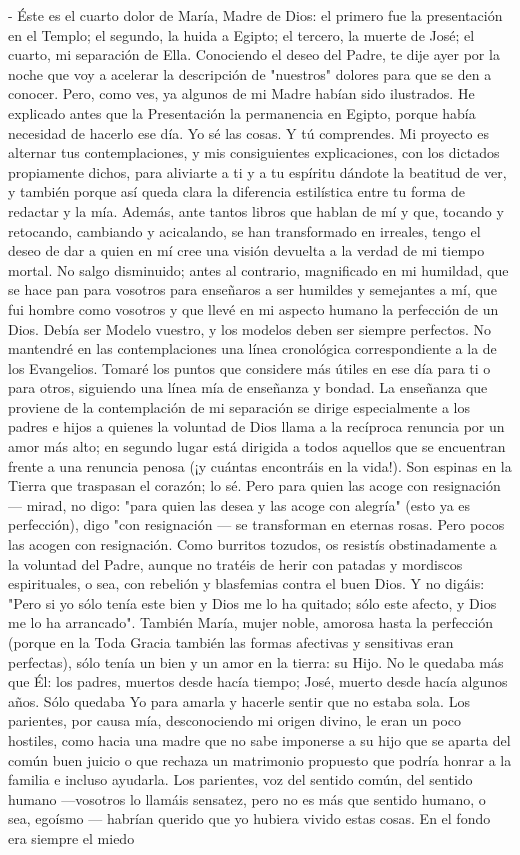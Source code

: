 \documentclass[12pt, twoside, openright]{book} %
\begin{document}
- Éste es el cuarto dolor de María, Madre de Dios: el primero fue la presentación en el Templo; el segundo, la huida a Egipto; el tercero, la muerte de José; el cuarto, mi separación de Ella. Conociendo el deseo del Padre, te dije ayer por la noche que voy a acelerar la descripción de "nuestros" dolores para que se den a conocer. Pero, como ves, ya algunos de mi Madre habían sido ilustrados. He explicado antes que la Presentación la permanencia en Egipto, porque había necesidad de hacerlo ese día. Yo sé las cosas. Y tú comprendes. Mi proyecto es alternar tus contemplaciones, y mis consiguientes explicaciones, con los dictados propiamente dichos, para aliviarte a ti y a tu espíritu dándote la beatitud de ver, y también porque así queda clara la diferencia estilística entre tu forma de redactar y la mía. Además, ante tantos libros que hablan de mí y que, tocando y retocando, cambiando y acicalando, se han transformado en irreales, tengo el deseo de dar a quien en mí cree una visión devuelta a la verdad de mi tiempo mortal. No salgo disminuido; antes al contrario, magnificado en mi humildad, que se hace pan para vosotros para enseñaros a ser humildes y semejantes a mí, que fui hombre como vosotros y que llevé en mi aspecto humano la perfección de un Dios. Debía ser Modelo vuestro, y los modelos deben ser siempre perfectos. No mantendré en las contemplaciones una línea cronológica correspondiente a la de los Evangelios. Tomaré los puntos que considere más útiles en ese día para ti o para otros, siguiendo una línea mía de enseñanza y bondad. La enseñanza que proviene de la contemplación de mi separación se dirige especialmente a los padres e hijos a quienes la voluntad de Dios llama a la recíproca renuncia por un amor más alto; en segundo lugar está dirigida a todos aquellos que se encuentran frente a una renuncia penosa (¡y cuántas encontráis en la vida!). Son espinas en la Tierra que traspasan el corazón; lo sé. Pero para quien las acoge con resignación — mirad, no digo: "para quien las desea y las acoge con alegría" (esto ya es perfección), digo "con resignación — se transforman en eternas rosas. Pero pocos las acogen con resignación. Como burritos tozudos, os resistís obstinadamente a la voluntad del Padre, aunque no tratéis de herir con patadas y mordiscos espirituales, o sea, con rebelión y blasfemias contra el buen Dios. Y no digáis: "Pero si yo sólo tenía este bien y Dios me lo ha quitado; sólo este afecto, y Dios me lo ha arrancado". También María, mujer noble, amorosa hasta la perfección (porque en la Toda Gracia también las formas afectivas y sensitivas eran perfectas), sólo tenía un bien y un amor en la tierra: su Hijo. No le quedaba más que Él: los padres, muertos desde hacía tiempo; José, muerto desde hacía algunos años. Sólo quedaba Yo para amarla y hacerle sentir que no estaba sola. Los parientes, por causa mía, desconociendo mi origen divino, le eran un poco hostiles, como hacia una madre que no sabe imponerse a su hijo que se aparta del común buen juicio o que rechaza un matrimonio propuesto que podría honrar a la familia e incluso ayudarla. Los parientes, voz del sentido común, del sentido humano —vosotros lo llamáis sensatez, pero no es más que sentido humano, o sea, egoísmo — habrían querido que yo hubiera vivido estas cosas. En el fondo era siempre el miedo 
\end{document}
